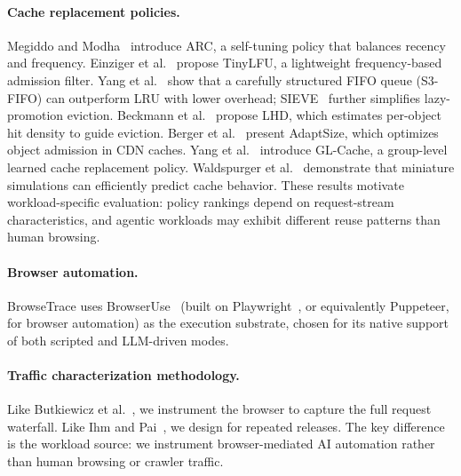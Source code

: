 \documentclass[10pt,sigconf,letterpaper,anonymous,nonacm]{acmart}
\newcommand{\sysname}{Browse\-Trace\xspace}
\begin{document}
\paragraph{Cache replacement policies.}
Megiddo and Modha~\cite{megiddo2003} introduce ARC, a self-tuning
policy that balances recency and frequency.
Einziger et al.~\cite{einziger2017} propose TinyLFU, a lightweight
frequency-based admission filter.
Yang et al.~\cite{yang2023s3fifo} show that a carefully structured FIFO
queue (S3-FIFO) can outperform LRU with lower overhead;
SIEVE~\cite{yang2023sieve} further simplifies lazy-promotion eviction.
Beckmann et al.~\cite{lhd2018} propose LHD, which estimates per-object
hit density to guide eviction.
Berger et al.~\cite{berger2017} present AdaptSize, which optimizes
object admission in CDN caches.
Yang et al.~\cite{yang2023glcache} introduce GL-Cache, a
group-level learned cache replacement policy.
Waldspurger et al.~\cite{waldspurger2017} demonstrate that miniature
simulations can efficiently predict cache behavior.
These results motivate workload-specific evaluation: policy rankings
depend on request-stream characteristics, and agentic workloads may
exhibit different reuse patterns than human browsing.

\paragraph{Browser automation.}
\sysname uses BrowserUse~\cite{browseruse} (built on
Playwright~\cite{playwright}, or equivalently Puppeteer, for browser automation) as the execution substrate, chosen for
its native support of both scripted and LLM-driven modes.

\paragraph{Traffic characterization methodology.}
Like Butkiewicz et al.~\cite{butkiewicz2011}, we instrument the
browser to capture the full request waterfall.  Like Ihm and
Pai~\cite{ihm2011}, we design for repeated releases.  The key
difference is the workload source: we instrument browser-mediated AI
automation rather than human browsing or crawler traffic.
\end{document}
